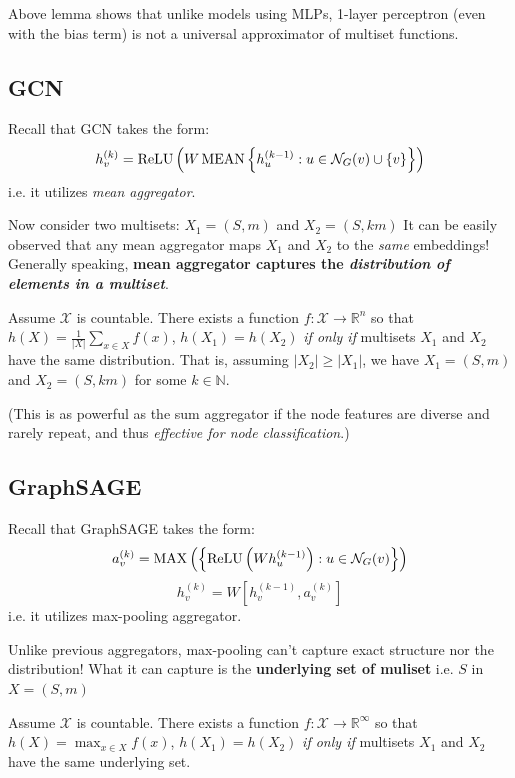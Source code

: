 Above lemma shows that unlike models using MLPs, 1-layer perceptron (even with the bias term) is not a universal approximator of multiset functions.


\subsection{GCN}

Recall that GCN\cite{Kipf2017} takes the form:
	$$h_v^{(k)} = \operatorname{ReLU} \left( W \operatorname{MEAN} \left\{ h_u^{(k - 1)} : u \in \mathcal{N}_G(v) \cup \{v\} \right\} \right)$$
i.e. it utilizes {\it mean aggregator}.

Now consider two multisets: $X_1 = (S, m)$ and $X_2 = (S, k m)$
It can be easily observed that any mean aggregator maps $X_1$ and $X_2$ to the {\it same} embeddings!
Generally speaking, {\bf mean aggregator captures the {\it distribution of elements in a multiset}}.

\begin{corollary}
Assume $\mathcal{X}$ is countable.
There exists a function $f : \mathcal{X} \rightarrow \mathbb{R}^n$ so that $h(X) = \frac{1}{|X|}\sum_{x \in X} f(x)$, $h(X_1) = h(X_2)$ {\it if only if} multisets $X_1$ and $X_2$ have the same distribution.
That is, assuming $|X_2| \geq |X_1|$, we have $X_1 = (S, m)$ and $X_2 = (S, k m)$ for some $k \in \mathbb{N}$.
\end{corollary}

(This is as powerful as the sum aggregator if the node features are diverse and rarely repeat, and thus {\it effective for node classification}.)


\subsection{GraphSAGE}

Recall that GraphSAGE\cite{Hamilton2017} takes the form:
	$$a_v^{(k)} = \operatorname{MAX} \left( \left\{ \operatorname{ReLU} \left( W h_u^{(k - 1)} \right) : u \in \mathcal{N}_G(v) \right\} \right)$$
	$$h_v^{(k)} = W \left[ h_v^{(k - 1)}, a_v^{(k)} \right]$$
i.e. it utilizes max-pooling aggregator.
	
Unlike previous aggregators, max-pooling can't capture exact structure nor the distribution!
What it can capture is the {\bf underlying set of muliset} i.e. $S$ in $X = (S, m)$

\begin{corollary}
Assume $\mathcal{X}$ is countable.
There exists a function $f : \mathcal{X} \rightarrow \mathbb{R}^\infty$ so that $h(X) = \max_{x \in X} f(x)$, $h(X_1) = h(X_2)$ {\it if only if} multisets $X_1$ and $X_2$ have the same underlying set.
\end{corollary}


